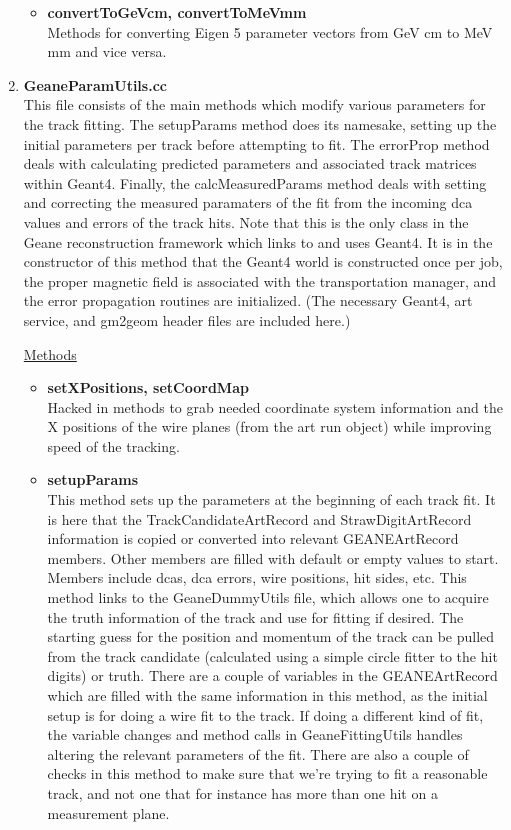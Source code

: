 \documentclass{article}
\begin{document}
\begin{enumerate}
\begin{itemize}
          \item{\bf{convertToGeVcm, convertToMeVmm}} \\
          Methods for converting Eigen 5 parameter vectors from GeV cm to MeV mm and vice versa.

        \end{itemize}

      \item{\bf{GeaneParamUtils.cc}} \\
      This file consists of the main methods which modify various parameters for the track fitting. The setupParams method does its namesake, setting up the initial parameters per track before attempting to fit. The errorProp method deals with calculating predicted parameters and associated track matrices within Geant4. Finally, the calcMeasuredParams method deals with setting and correcting the measured paramaters of the fit from the incoming dca values and errors of the track hits. Note that this is the only class in the Geane reconstruction framework which links to and uses Geant4. It is in the constructor of this method that the Geant4 world is constructed once per job, the proper magnetic field is associated with the transportation manager, and the error propagation routines are initialized. (The necessary Geant4, art service, and gm2geom header files are included here.)

      \underline{Methods}

        \begin{itemize}

          \item{\bf{setXPositions, setCoordMap}} \\
          Hacked in methods to grab needed coordinate system information and the X positions of the wire planes (from the art run object) while improving speed of the tracking.

          \item{\bf{setupParams}} \\
          This method sets up the parameters at the beginning of each track fit. It is here that the TrackCandidateArtRecord and StrawDigitArtRecord information is copied or converted into relevant GEANEArtRecord members. Other members are filled with default or empty values to start. Members include dcas, dca errors, wire positions, hit sides, etc. This method links to the GeaneDummyUtils file, which allows one to acquire the truth information of the track and use for fitting if desired. The starting guess for the position and momentum of the track can be pulled from the track candidate (calculated using a simple circle fitter to the hit digits) or truth. There are a couple of variables in the GEANEArtRecord which are filled with the same information in this method, as the initial setup is for doing a wire fit to the track. If doing a different kind of fit, the variable changes and method calls in GeaneFittingUtils handles altering the relevant parameters of the fit. There are also a couple of checks in this method to make sure that we're trying to fit a reasonable track, and not one that for instance has more than one hit on a measurement plane.


\end{itemize}
\end{enumerate}
\end{document}
